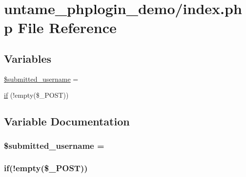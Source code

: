\hypertarget{index_8php}{}\section{untame\+\_\+phplogin\+\_\+demo/index.php File Reference}
\label{index_8php}
\subsection*{Variables}
\begin{DoxyCompactItemize}
\item 
\hyperlink{index_8php_a816cebe82f2bc6bfe56b4bb45f32eb20}{\$submitted\+\_\+username} = \textquotesingle{}\textquotesingle{}
\item 
\hyperlink{index_8php_a6f7e69680829fd3b12010f59897f7513}{if} (!empty(\$\+\_\+\+P\+O\+S\+T))
\end{DoxyCompactItemize}


\subsection{Variable Documentation}
\hypertarget{index_8php_a816cebe82f2bc6bfe56b4bb45f32eb20}{}
\subsubsection[{\$submitted\+\_\+username}]{\setlength{\rightskip}{0pt plus 5cm}\$submitted\+\_\+username = \textquotesingle{}\textquotesingle{}}\label{index_8php_a816cebe82f2bc6bfe56b4bb45f32eb20}
\hypertarget{index_8php_a6f7e69680829fd3b12010f59897f7513}{}
\subsubsection[{if}]{\setlength{\rightskip}{0pt plus 5cm}if(!empty(\$\+\_\+\+P\+O\+S\+T))}\label{index_8php_a6f7e69680829fd3b12010f59897f7513}
